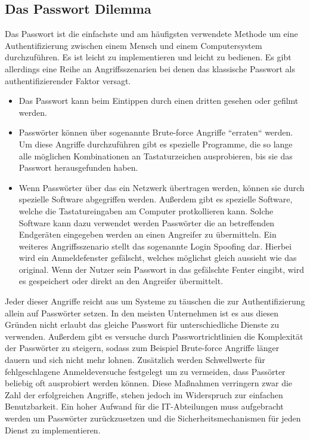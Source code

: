 \documentclass[
a4paper,   
titlepage,  
halfparskip,
12pt        
]{scrartcl}
\begin{document}
\begin{onehalfspacing}
\subsection{Das Passwort Dilemma}
\label{subsec:pass}
Das Passwort ist die einfachste und am häufigsten verwendete Methode um eine Authentifizierung zwischen einem Mensch und einem Computersystem durchzuführen. Es ist leicht zu implementieren und leicht zu bedienen. Es gibt allerdings eine Reihe an Angriffsszenarien bei denen das klassische Passwort als authentifizierender Faktor versagt.
\begin{itemize}
	\item Das Passwort kann beim Eintippen durch einen dritten gesehen oder gefilmt werden. 
	\item Passwörter können über sogenannte Brute-force Angriffe ``erraten`` werden. Um diese Angriffe durchzuführen gibt es spezielle Programme, die so lange alle möglichen Kombinationen an Tastaturzeichen ausprobieren, bis sie das Passwort herausgefunden haben. 
	\item Wenn Passwörter über das ein Netzwerk übertragen werden, können sie durch spezielle Software abgegriffen werden. Außerdem gibt es spezielle Software, welche die Tastatureingaben am Computer protkollieren kann. Solche Software kann dazu verwendet werden Passwörter die an betreffenden Endgeräten eingegeben werden an einen Angreifer zu übermitteln.
	Ein weiteres Angriffsszenario stellt das sogenannte Login Spoofing dar. Hierbei wird ein Anmeldefenster gefälscht, welches möglichst gleich aussieht wie das original. Wenn der Nutzer sein Passwort in das gefälschte Fenter eingibt, wird es gespeichert oder direkt an den Angreifer übermittelt. 
\end{itemize}
Jeder dieser Angriffe reicht aus um Systeme zu täuschen die zur Authentifizierung allein auf Passwörter setzen. In den meisten Unternehmen ist es aus diesen Gründen nicht erlaubt das gleiche Passwort für unterschiedliche Dienste zu verwenden. Außerdem gibt es versuche durch Passwortrichtlinien die Komplexität der Passwörter zu steigern, sodass zum Beispiel Brute-force Angriffe länger dauern und sich nicht mehr lohnen. Zusätzlich werden Schwellwerte für fehlgeschlagene Anmeldeversuche festgelegt um zu vermeiden, dass Passörter beliebig oft ausprobiert werden können. Diese Maßnahmen verringern zwar die Zahl der erfolgreichen Angriffe, stehen jedoch im Widerspruch zur einfachen Benutzbarkeit. Ein hoher Aufwand für die \ac{IT}-Abteilungen muss aufgebracht werden um Passwörter zurückzusetzen und die Sicherheitsmechanismen für jeden Dienst zu implementieren.\cite[S. 3ff]{hong}

\end{onehalfspacing}
\end{document}
